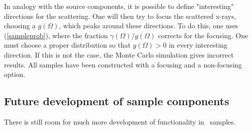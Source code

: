 In analogy with the source components, it is possible to define
"interesting" directions for the scattering.
One will then try to focus the scattered x-rays,
choosing a $g(\Omega)$, which peaks around these directions.
To do this, one uses (\ref{sampleprob}), where the
fraction $\gamma(\Omega)/g(\Omega)$ corrects for the focusing.
One must choose a proper distribution so that
$g(\Omega) > 0$ in every interesting direction. If this is not the
case, the Monte Carlo simulation gives incorrect results.
All samples have been constructed with a focusing
and a non-focusing option.


\subsection{Future development of sample components}
There is still room for much more development of functionality in
\MCX\ samples.

\newpage
 \newpage
          \newpage
\newpage
   \newpage
 \newpage
%
